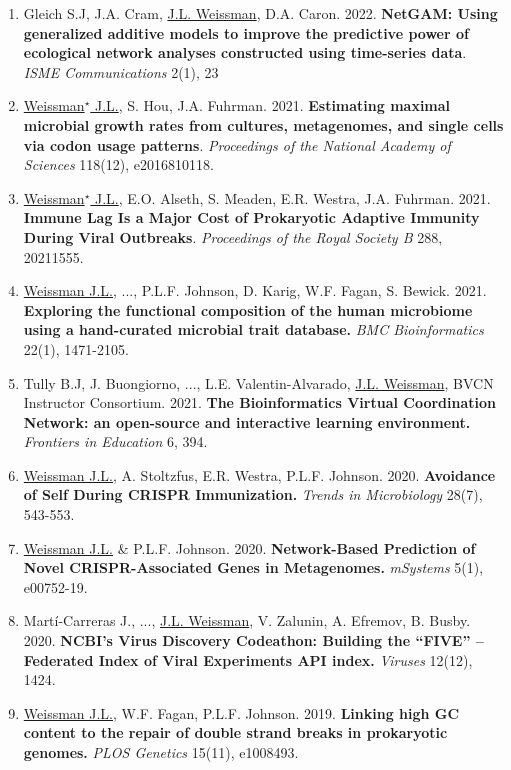 \documentclass[]{res}
\begin{document}
\begin{resume}
\begin{enumerate}[leftmargin=*]
 \item Gleich S.J, J.A. Cram, \underline{J.L. Weissman}, D.A. Caron. 2022. {\bf NetGAM: Using generalized additive models to improve the predictive power of ecological network analyses constructed using time-series data}. \emph{ISME Communications} 2(1), 23
 
\item \underline{Weissman$^\star$ J.L.}, S. Hou, J.A. Fuhrman. 2021. {\bf Estimating maximal microbial growth rates from cultures, metagenomes, and single cells via codon usage patterns}. \emph{Proceedings of the National Academy of Sciences} 118(12), e2016810118. 
 
\item \underline{Weissman$^\star$ J.L.}, E.O. Alseth, S. Meaden, E.R. Westra, J.A. Fuhrman. 2021. {\bf Immune Lag Is a Major Cost of Prokaryotic Adaptive Immunity During Viral Outbreaks}. \emph{Proceedings of the Royal Society B} 288, 20211555.

\item \underline{Weissman J.L.}, ..., P.L.F. Johnson, D. Karig, W.F. Fagan, S. Bewick. 2021. {\bf Exploring the functional composition of the human microbiome using a hand-curated microbial trait database.} \emph{BMC Bioinformatics} 22(1), 1471-2105.

\item Tully B.J, J. Buongiorno, ..., L.E. Valentin-Alvarado, \underline{J.L. Weissman}, BVCN Instructor Consortium. 2021. {\bf The Bioinformatics Virtual Coordination Network: an open-source and interactive learning environment.} \emph{Frontiers in Education} 6, 394.

\item \underline{Weissman J.L.}, A. Stoltzfus, E.R. Westra, P.L.F. Johnson. 2020. {\bf Avoidance of Self During CRISPR Immunization.} \emph{Trends in Microbiology} 28(7), 543-553.

\item \underline{Weissman J.L.} \& P.L.F. Johnson. 2020. {\bf Network-Based Prediction of Novel CRISPR-Associated Genes in Metagenomes.} \emph{mSystems} 5(1), e00752-19.

\item Mart\'{i}-Carreras J., ..., \underline{J.L. Weissman}, V. Zalunin, A. Efremov, B. Busby. 2020. {\bf NCBI’s Virus Discovery Codeathon: Building the “FIVE” -- Federated Index of Viral Experiments API index.} \emph{Viruses} 12(12), 1424.
 
 \item \underline{Weissman J.L.}, W.F. Fagan, P.L.F. Johnson. 2019. {\bf Linking high GC content to the repair of double strand breaks in prokaryotic genomes.} \emph{PLOS Genetics} 15(11), e1008493. %
 

\end{enumerate}
\end{resume}
\end{document}
